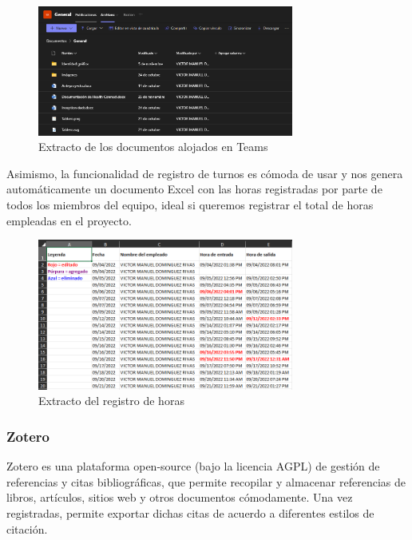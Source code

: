             \begin{figure}[h!]
                \centering
                \includegraphics[width=0.75\textwidth]{figures/archivos teams.PNG}
                \caption{Extracto de los documentos alojados en Teams}
                \label{fig:teams:documentos}
            \end{figure}
            
            Asimismo, la funcionalidad de registro de turnos es cómoda de usar y nos genera automáticamente un documento
            Excel con las horas registradas por parte de todos los miembros del equipo, ideal si queremos registrar el 
            total de horas empleadas en el proyecto. \newline

            \begin{figure}[h!]
                \centering
                \includegraphics[width=0.75\textwidth]{figures/Teams excel.PNG}
                \caption{Extracto del registro de horas}
                \label{fig:teams:excel}
            \end{figure}
        

        \subsubsection{Zotero}
            Zotero es una plataforma open-source (bajo la licencia AGPL) de gestión de referencias y citas 
            bibliográficas, que permite recopilar y almacenar referencias de libros, artículos, sitios web y otros 
            documentos cómodamente. Una vez registradas, permite exportar dichas citas de acuerdo a diferentes estilos 
            de citación. \newline
                
